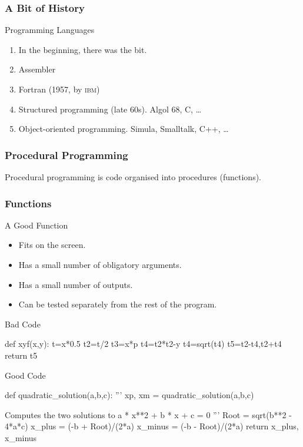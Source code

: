 \begin{frame}[fragile]
\frametitle{A Bit of History}

\begin{block}{Programming Languages}
\begin{enumerate}
\item In the beginning, there was the bit.
\item Assembler
\item Fortran (1957, by \textsc{ibm})
\item Structured programming (late 60s). Algol 68, C, \ldots
\item Object-oriented programming. Simula, Smalltalk, C++, \ldots %
\end{enumerate}
\end{block}
\end{frame}

\begin{frame}[fragile]
\frametitle{Procedural Programming}
Procedural programming is code organised into procedures (functions).
\end{frame}

\begin{frame}[fragile]
\frametitle{Functions}
\begin{block}{A Good Function}
\begin{itemize}
\item Fits on the screen.
\item Has a small number of obligatory arguments.
\item Has a small number of outputs.
\item Can be tested separately from the rest of the program.
\end{itemize}
\end{block}
\end{frame}

\begin{frame}[fragile]
\begin{block}{Bad Code}
\begin{python}
def xyf(x,y):
    t=x*0.5
    t2=t/2
    t3=x*p
    t4=t2*t2-y
    t4=sqrt(t4)
    t5=t2-t4,t2+t4
    return t5

\end{python}
\end{block}
\end{frame}

\begin{frame}[fragile]

\begin{block}{Good Code}
\begin{python}
def quadratic_solution(a,b,c):
    '''
    xp, xm = quadratic_solution(a,b,c)

    Computes the two solutions to
        a * x**2 + b * x + c = 0
    '''
    Root = sqrt(b**2 - 4*a*c)
    x_plus = (-b + Root)/(2*a)
    x_minus = (-b - Root)/(2*a)
    return x_plus, x_minus

\end{python}

\end{block}
\end{frame}


